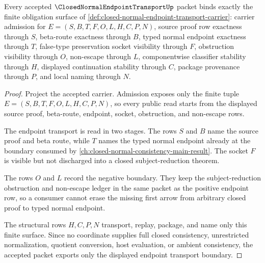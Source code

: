 \begin{theorem}
\label{thm:closed-normal-endpoint-transport-namecert-obligations}
Every accepted $\ClosedNormalEndpointTransportUp$ packet binds exactly the finite obligation surface of \autoref{def:closed-normal-endpoint-transport-carrier}: carrier admission for $E=(S,B,T,F,O,L,H,C,P,N)$, source proof row exactness through $S$, beta-route exactness through $B$, typed normal endpoint exactness through $T$, false-type preservation socket visibility through $F$, obstruction visibility through $O$, non-escape through $L$, componentwise classifier stability through $H$, displayed continuation stability through $C$, package provenance through $P$, and local naming through $N$.
\end{theorem}
\begin{proof}
Project the accepted carrier. Admission exposes only the finite tuple $E=(S,B,T,F,O,L,H,C,P,N)$, so every public read starts from the displayed source proof, beta-route, endpoint, socket, obstruction, and non-escape rows.

The endpoint transport is read in two stages. The rows $S$ and $B$ name the source proof and beta route, while $T$ names the typed normal endpoint already at the boundary consumed by \autoref{ch:closed-normal-consistency-main-result}. The socket $F$ is visible but not discharged into a closed subject-reduction theorem.

The rows $O$ and $L$ record the negative boundary. They keep the subject-reduction obstruction and non-escape ledger in the same packet as the positive endpoint row, so a consumer cannot erase the missing first arrow from arbitrary closed proof to typed normal endpoint.

The structural rows $H,C,P,N$ transport, replay, package, and name only this finite surface. Since no coordinate supplies full closed consistency, unrestricted normalization, quotient conversion, host evaluation, or ambient consistency, the accepted packet exports only the displayed endpoint transport boundary.
\end{proof}

